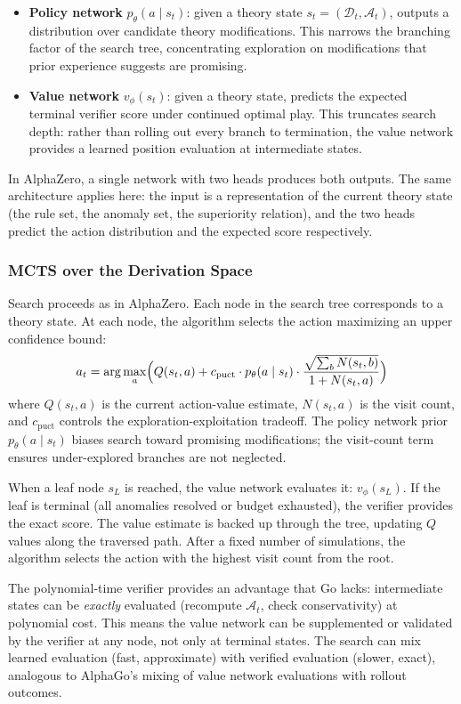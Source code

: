 \documentclass{article}
\theoremstyle{definition}
\newcommand{\D}{\mathcal{D}}
\begin{document}
\begin{itemize}[nosep]
    \item \textbf{Policy network} $p_\theta(a \mid s_t)$: given a theory state $s_t = (\D_t, \mathcal{A}_t)$, outputs a distribution over candidate theory modifications. This narrows the branching factor of the search tree, concentrating exploration on modifications that prior experience suggests are promising.
    \item \textbf{Value network} $v_\phi(s_t)$: given a theory state, predicts the expected terminal verifier score under continued optimal play. This truncates search depth: rather than rolling out every branch to termination, the value network provides a learned position evaluation at intermediate states.
\end{itemize}

In AlphaZero, a single network with two heads produces both outputs. The same architecture applies here: the input is a representation of the current theory state (the rule set, the anomaly set, the superiority relation), and the two heads predict the action distribution and the expected score respectively.

\subsubsection{MCTS over the Derivation Space}

Search proceeds as in AlphaZero. Each node in the search tree corresponds to a theory state. At each node, the algorithm selects the action maximizing an upper confidence bound:
\[
    a_t = \arg\max_a \Bigl( Q(s_t, a) + c_{\mathrm{puct}} \cdot p_\theta(a \mid s_t) \cdot \frac{\sqrt{\sum_b N(s_t, b)}}{1 + N(s_t, a)} \Bigr)
\]
where $Q(s_t, a)$ is the current action-value estimate, $N(s_t, a)$ is the visit count, and $c_{\mathrm{puct}}$ controls the exploration-exploitation tradeoff. The policy network prior $p_\theta(a \mid s_t)$ biases search toward promising modifications; the visit-count term ensures under-explored branches are not neglected.

When a leaf node $s_L$ is reached, the value network evaluates it: $v_\phi(s_L)$. If the leaf is terminal (all anomalies resolved or budget exhausted), the verifier provides the exact score. The value estimate is backed up through the tree, updating $Q$ values along the traversed path. After a fixed number of simulations, the algorithm selects the action with the highest visit count from the root.

The polynomial-time verifier provides an advantage that Go lacks: intermediate states can be \emph{exactly} evaluated (recompute $\mathcal{A}_t$, check conservativity) at polynomial cost. This means the value network can be supplemented or validated by the verifier at any node, not only at terminal states. The search can mix learned evaluation (fast, approximate) with verified evaluation (slower, exact), analogous to AlphaGo's mixing of value network evaluations with rollout outcomes.
\end{document}
